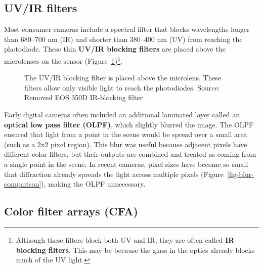\documentclass[
  letterpaper,
]{book}
\begin{document}
\subsection{UV/IR filters}\label{sec-sensor-irfilter}

Most consumer cameras include a spectral filter that blocks wavelengths
longer than 680--700 nm (IR) and shorter than 380--400 nm (UV) from
reaching the photodiode. These thin \textbf{UV/IR blocking filters} are
placed above the microlenses on the sensor
(Figure~\ref{fig-sensor-uvir})\footnote{Although these filters block
  both UV and IR, they are often called \textbf{IR blocking filters}.
  This may be because the glass in the optics already blocks much of the
  UV light.}.

\begin{figure}


\caption{\label{fig-sensor-uvir}The UV/IR blocking filter is placed
above the microlens. These filters allow only visible light to reach the
photodiodes. Source: Removed EOS 350D IR-blocking filter}

\end{figure}%

Early digital cameras often included an additional laminated layer
called an \textbf{optical low pass filter (OLPF)}, which slightly
blurred the image. The OLPF ensured that light from a point in the scene
would be spread over a small area (such as a 2x2 pixel region). This
blur was useful because adjacent pixels have different color filters,
but their outputs are combined and treated as coming from a single point
in the scene. In recent cameras, pixel sizes have become so small that
diffraction already spreads the light across multiple pixels
(Figure~\ref{fig-blur-comparison}), making the OLPF unnecessary.

\subsection{Color filter arrays (CFA)}\label{sec-sensor-cfa}
\end{document}
